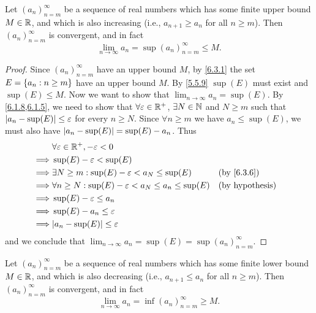 \begin{prop}\label{6.3.8}
  Let \((a_n)_{n = m}^\infty\) be a sequence of real numbers which has some finite upper bound \(M \in \mathbb{R}\), and which is also increasing (i.e., \(a_{n + 1} \geq a_n\) for all \(n \geq m\)).
  Then \((a_n)_{n = m}^\infty\) is convergent, and in fact
  \[
    \lim_{n \to \infty} a_n = \sup(a_n)_{n = m}^\infty \leq M.
  \]
\end{prop}

\begin{proof}
  Since \((a_n)_{n = m}^\infty\) have an upper bound \(M\), by \cref{6.3.1} the set \(E = \left\lbrace a_n : n \geq m\right\rbrace\) have an upper bound \(M\).
  By \cref{5.5.9} \(\sup(E)\) must exist and \(\sup(E) \leq M\).
  Now we want to show that \(\lim_{n \to \infty} a_n = \sup(E)\).
  By \cref{6.1.8,6.1.5}, we need to show that \(\forall \varepsilon \in \mathbb{R}^+\), \(\exists N \in \mathbb{N}\) and \(N \geq m\) such that \(\left\lvert a_n - \sup(E)\right\rvert \leq \varepsilon\) for every \(n \geq N\).
  Since \(\forall n \geq m\) we have \(a_n \leq \sup(E)\), we must also have \(\left\lvert a_n - \sup(E)\right\rvert = \sup(E) - a_n\).
  Thus
  \begin{align*}
             & \forall \varepsilon \in \R^+, -\varepsilon < 0                                                   \\
    \implies & \sup(E) - \varepsilon < \sup(E)                                                                  \\
    \implies & \exists N \geq m : \sup(E) - \varepsilon < a_N \leq \sup(E)          &  & \by{6.3.6}             \\
    \implies & \forall n \geq N : \sup(E) - \varepsilon < a_N \leq a_n \leq \sup(E) &  & \text{(by hypothesis)} \\
    \implies & \sup(E) - \varepsilon \leq a_n                                                                   \\
    \implies & \sup(E) - a_n \leq \varepsilon                                                                   \\
    \implies & \abs{a_n - \sup(E)} \leq \varepsilon
  \end{align*}
  and we conclude that \(\lim_{n \to \infty} a_n = \sup(E) = \sup(a_n)_{n = m}^\infty\).
\end{proof}

\begin{ac}\label{ac:6.3.1}
  Let \((a_n)_{n = m}^\infty\) be a sequence of real numbers which has some finite lower bound \(M \in \mathbb{R}\), and which is also decreasing (i.e., \(a_{n + 1} \leq a_n\) for all \(n \geq m\)).
  Then \((a_n)_{n = m}^\infty\) is convergent, and in fact
  \[
    \lim_{n \to \infty} a_n = \inf(a_n)_{n = m}^\infty \geq M.
  \]
\end{ac}

